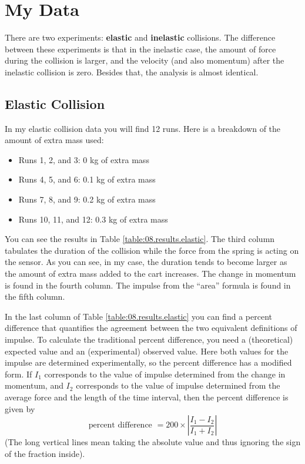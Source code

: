 \section{My Data}
%
There are two experiments: \textbf{elastic} and \textbf{inelastic} collisions. The difference between these experiments is that in the inelastic case, the amount of force during the collision is larger, and the velocity (and also momentum) after the inelastic collision is zero. Besides that, the analysis is almost identical.
%
\subsection{Elastic Collision}
%
In my elastic collision data you will find 12 runs. Here is a breakdown of the amount of extra mass used:
\begin{itemize}
    \item Runs 1, 2, and 3: 0 kg of extra mass
    \item Runs 4, 5, and 6: 0.1 kg of extra mass
    \item Runs 7, 8, and 9: 0.2 kg of extra mass
    \item Runs 10, 11, and 12: 0.3 kg of extra mass
\end{itemize}
You can see the results in Table \ref{table:08.results.elastic}. The third column tabulates the duration of the collision while the force from the spring is acting on the sensor. As you can see, in my case, the duration tends to become larger as the amount of extra mass added to the cart increases. The change in momentum is found in the fourth column. The impulse from the ``area'' formula is found in the fifth column.

In the last column of Table \ref{table:08.results.elastic} you can find a percent difference that quantifies the agreement between the two equivalent definitions of impulse. To calculate the traditional percent difference, you need a (theoretical) expected value and an (experimental) observed value. Here both values for the impulse are determined experimentally, so the percent difference has a modified form. If $I_{1}$ corresponds to the value of impulse determined from the change in momentum, and $I_{2}$ corresponds to the value of impulse determined from the average force and the length of the time interval, then the percent difference is given by
\begin{equation}
    \text{percent difference } = 200 \times \left\vert \frac{I_{1} - I_{2}}{I_{1} + I_{2}} \right\vert
\end{equation}
(The long vertical lines mean taking the absolute value and thus ignoring the sign of the fraction inside).
%
